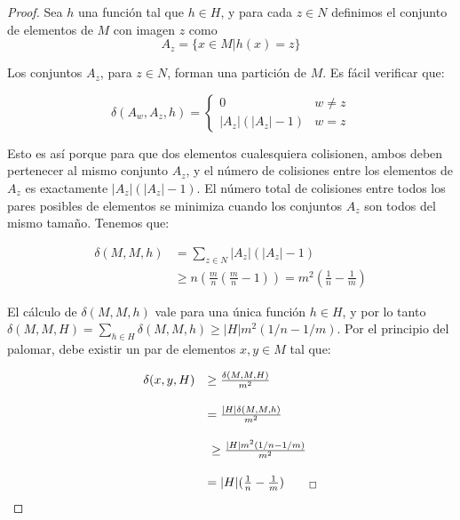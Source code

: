 \documentclass[a4paper,12pt, oneside]{article}
\begin{document}
\begin{proof}
	Sea $h$ una función tal que $h \in H$, y para cada $z \in N$ definimos el conjunto de elementos de $M$ con imagen $z$ como
	\begin{equation}
		A_z = \{  x \in M | h(x) = z \}
	\end{equation}
	
	Los conjuntos $A_z$, para $z \in N$, forman una partición de $M$. Es fácil verificar que:
	
	\begin{equation}
		\delta(A_w,A_z,h) = \left\{
									\begin{array}{cl}
										0 & w \neq z \\
										|A_z|(|A_z| - 1) & w=z
									\end{array}
								\right.
	\end{equation}
	
	Esto es así porque para que dos elementos cualesquiera colisionen, ambos deben pertenecer al mismo conjunto $A_z$, y el número de colisiones entre los elementos de $A_z$ es exactamente $|A_z|(|A_z| - 1)$. El número total de colisiones entre todos los pares posibles de elementos se minimiza cuando los conjuntos $A_z$ son todos del mismo tamaño. Tenemos que:
	
	\begin{equation}
		\begin{array}{ll} 
			\delta(M,M,h) & = \sum\limits_{z \in N} |A_z|(|A_z| - 1) \\[0.5cm]
									& \geq n (\frac{m}{n} (\frac{m}{n} - 1)) = m^2(\frac{1}{n}-\frac{1}{m})
		\end{array}
	\end{equation}
	
	El cálculo de $\delta(M,M,h)$ vale para una única función $h \in H$, y por lo tanto $\delta(M,M,H) = \sum_{h \in H} \delta(M,M,h) \geq |H|m^2(1/n-1/m)$. Por el principio del palomar, debe existir un par de elementos $x, y \in M$ tal que:
	
	\begin{equation}
		\begin{array}{ll}
			\delta(x,y,H) & \geq \frac{\delta(M,M,H)}{m^2} \\[0.5cm]
								  & = \frac{|H|\delta(M,M,h)}{m^2} \\[0.5cm]
								  & \geq \frac{|H|m^2(1/n-1/m)}{m^2}\\[0.5cm]
								  & = |H|(\frac{1}{n}-\frac{1}{m})_{\qed}
		\end{array}
	\end{equation}

\end{proof}
\end{document}
